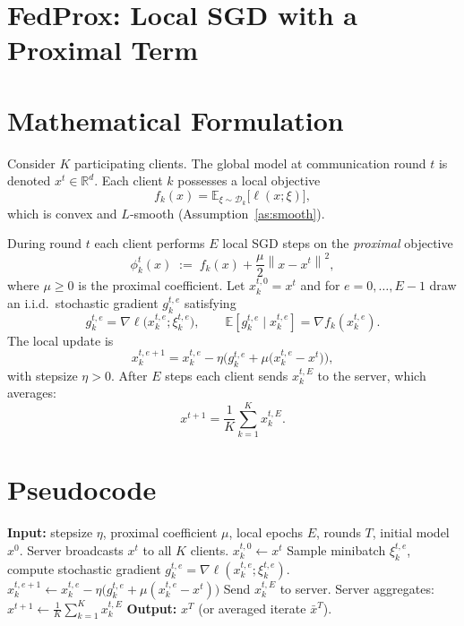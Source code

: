\documentclass[11pt]{article}
\newcommand{\E}{\mathbb{E}}
\newcommand{\norm}[1]{\left\lVert #1\right\rVert}
\begin{document}
\section*{FedProx: Local SGD with a Proximal Term}

\section*{Mathematical Formulation}
Consider $K$ participating clients.  The global model at communication round $t$ is denoted $x^{t}\in\mathbb{R}^{d}$.  
Each client $k$ possesses a local objective
\[
f_k(x)=\E_{\xi\sim\mathcal{D}_k}\big[\ell(x;\xi)\big],
\]
which is convex and $L$‑smooth (Assumption~\ref{as:smooth}).  

During round $t$ each client performs $E$ local SGD steps on the \emph{proximal} objective
\[
\phi_{k}^{t}(x)\;:=\;f_k(x)+\frac{\mu}{2}\norm{x-x^{t}}^{2},
\tag{1}
\]
where $\mu\ge 0$ is the proximal coefficient.  
Let $x_{k}^{t,0}=x^{t}$ and for $e=0,\dots,E-1$ draw an i.i.d.\ stochastic gradient $g_{k}^{t,e}$ satisfying
\[
g_{k}^{t,e}= \nabla \ell\big(x_{k}^{t,e};\xi_{k}^{t,e}\big),\qquad
\E\!\left[g_{k}^{t,e}\mid x_{k}^{t,e}\right]=\nabla f_k\!\left(x_{k}^{t,e}\right).
\]
The local update is
\[
x_{k}^{t,e+1}=x_{k}^{t,e}-\eta\Big(g_{k}^{t,e}+\mu\big(x_{k}^{t,e}-x^{t}\big)\Big),
\tag{2}
\]
with stepsize $\eta>0$.  
After $E$ steps each client sends $x_{k}^{t,E}$ to the server, which averages:
\[
x^{t+1}= \frac{1}{K}\sum_{k=1}^{K}x_{k}^{t,E}.
\tag{3}
\]

\section*{Pseudocode}
\begin{algorithm}[H]
\caption{FedProx (Local SGD with Proximal Term)}\label{alg:fedprox}
\begin{algorithmic}[1]
\STATE \textbf{Input:} stepsize $\eta$, proximal coefficient $\mu$, local epochs $E$, rounds $T$, initial model $x^{0}$.
    \STATE Server broadcasts $x^{t}$ to all $K$ clients.
        \STATE $x_{k}^{t,0}\gets x^{t}$
            \STATE Sample minibatch $\xi_{k}^{t,e}$, compute stochastic gradient $g_{k}^{t,e}=\nabla\ell(x_{k}^{t,e};\xi_{k}^{t,e})$.
            \STATE $x_{k}^{t,e+1}\gets x_{k}^{t,e}-\eta\big(g_{k}^{t,e}+\mu(x_{k}^{t,e}-x^{t})\big)$ \hfill{}
        \ENDFOR
        \STATE Send $x_{k}^{t,E}$ to server.
    \ENDFOR
    \STATE Server aggregates: $x^{t+1}\gets \frac1K\sum_{k=1}^{K}x_{k}^{t,E}$ \hfill{}
\ENDFOR
\STATE \textbf{Output:} $x^{T}$ (or averaged iterate $\bar x^{T}$).
\end{algorithmic}
\end{algorithm}
\end{document}

